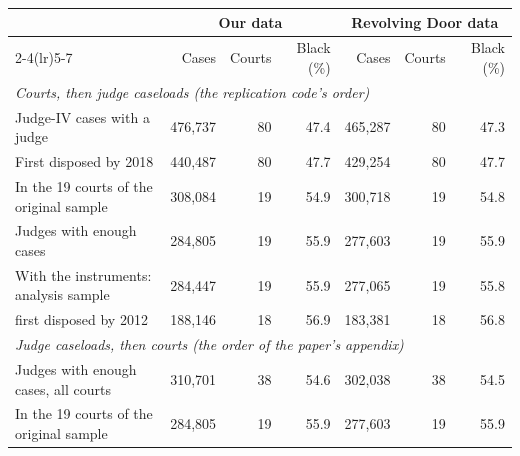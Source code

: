 \begin{tabular}{lrrrrrr}
\toprule
 & \multicolumn{3}{c}{Our data} & \multicolumn{3}{c}{Revolving Door data} \\
\cmidrule(lr){2-4}\cmidrule(lr){5-7}
 & Cases & Courts & Black (\%) & Cases & Courts & Black (\%) \\
\midrule
\multicolumn{7}{l}{\textit{Courts, then judge caseloads (the replication code's order)}} \\
\quad Judge-IV cases with a judge & 476,737 & 80 & 47.4 & 465,287 & 80 & 47.3 \\
\quad First disposed by 2018 & 440,487 & 80 & 47.7 & 429,254 & 80 & 47.7 \\
\quad In the 19 courts of the original sample & 308,084 & 19 & 54.9 & 300,718 & 19 & 54.8 \\
\quad Judges with enough cases & 284,805 & 19 & 55.9 & 277,603 & 19 & 55.9 \\
\quad With the instruments: analysis sample & 284,447 & 19 & 55.9 & 277,065 & 19 & 55.8 \\
\quad \quad first disposed by 2012 & 188,146 & 18 & 56.9 & 183,381 & 18 & 56.8 \\
\multicolumn{7}{l}{\textit{Judge caseloads, then courts (the order of the paper's appendix)}} \\
\quad Judges with enough cases, all courts & 310,701 & 38 & 54.6 & 302,038 & 38 & 54.5 \\
\quad In the 19 courts of the original sample & 284,805 & 19 & 55.9 & 277,603 & 19 & 55.9 \\
\bottomrule
\end{tabular}
